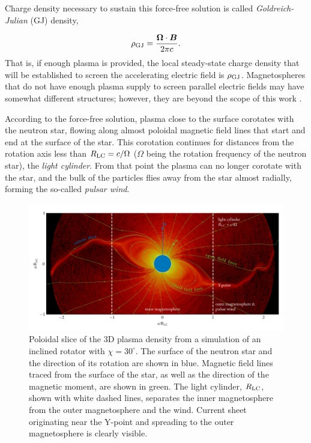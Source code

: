 Charge density necessary to sustain this force-free solution is called \emph{Goldreich-Julian} (GJ) density, \citep{1969ApJ...157..869G}

\begin{equation}
    \rho_{\rm GJ} = \frac{\bm{\Omega} \cdot\bm{B}}{2\pi c}.
\end{equation}
\noindent That is, if enough plasma is provided, the local steady-state charge density that will be established to screen the accelerating electric field is $\rho_{\rm GJ}$. Magnetospheres that do not have enough plasma supply to screen parallel electric fields may have somewhat different structures; however, they are beyond the scope of this work \citep[see, e.g.,][]{2020ApJ...889...69C}.

According to the force-free solution, plasma close to the surface corotates with the neutron star, flowing along almost poloidal magnetic field lines that start and end at the surface of the star. This corotation continues for distances from the rotation axis less than $R_{\rm LC}=c/\Omega$ ($\Omega$ being the rotation frequency of the neutron star), the \emph{light cylinder}. From that point the plasma can no longer corotate with the star, and the bulk of the particles flies away from the star almost radially, forming the so-called \emph{pulsar wind}.

\begin{figure}[htb]
\centering
\includegraphics[width=\columnwidth]{figures/ch3-pulsar/fig1.pdf}
\caption{Poloidal slice of the 3D plasma density from a simulation of an inclined rotator with $\chi=30^\circ$. The surface of the neutron star and the direction of its rotation are shown in blue. Magnetic field lines traced from the surface of the star, as well as the direction of the magnetic moment, are shown in green. The light cylinder, $R_{\rm LC}$, shown with white dashed lines, separates the inner magnetosphere from the outer magnetosphere and the wind. Current sheet originating near the Y-point and spreading to the outer magnetosphere is clearly visible. }
\label{fig:psr-pulsardraft}
\end{figure}

